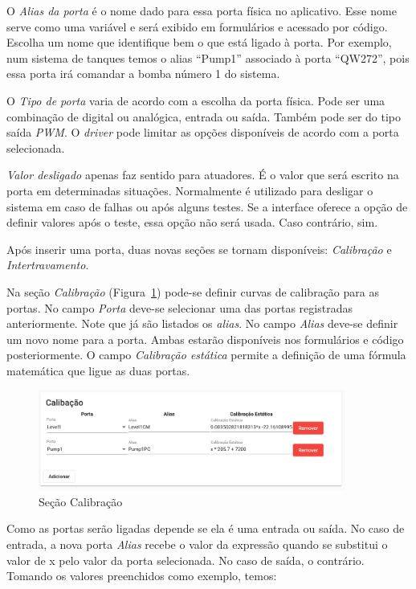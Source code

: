 O \textit{Alias da porta} é o nome dado para essa porta física no aplicativo.
Esse nome serve como uma variável e será exibido em formulários e acessado por
código. Escolha um nome que identifique bem o que está ligado à porta. Por
exemplo, num sistema de tanques temos o alias \enquote{Pump1} associado à porta
\enquote{QW272}, pois essa porta irá comandar a bomba número 1 do sistema.

O \textit{Tipo de porta} varia de acordo com a escolha da porta física. Pode ser
uma combinação de digital ou analógica, entrada ou saída. Também pode ser do
tipo saída \textit{PWM}. O \textit{driver} pode limitar as opções disponíveis de
acordo com a porta selecionada.

\textit{Valor desligado} apenas faz sentido para atuadores. É o valor que será
escrito na porta em determinadas situações. Normalmente é utilizado para
desligar o sistema em caso de falhas ou após alguns testes. Se a interface
oferece a opção de definir valores após o teste, essa opção não será usada. Caso
contrário, sim.

Após inserir uma porta, duas novas seções se tornam disponíveis:
\textit{Calibração} e \textit{Intertravamento}.

Na seção \textit{Calibração} (Figura~\ref{fig:hardware4}) pode-se definir curvas
de calibração para as portas. No campo \textit{Porta} deve-se selecionar uma das
portas registradas anteriormente. Note que já são listados os \textit{alias}. No
campo \textit{Alias} deve-se definir um novo nome para a porta. Ambas estarão
disponíveis nos formulários e código posteriormente. O campo \textit{Calibração
estática} permite a definição de uma fórmula matemática que ligue as duas
portas.

\begin{figure}[ht!]
    \centering
    \includegraphics[width=0.9\textwidth]{imgs/hardware4}
    \caption[Seção Calibração]{Seção Calibração}%
    \label{fig:hardware4}
\end{figure}

Como as portas serão ligadas depende se ela é uma entrada ou saída. No caso de
entrada, a nova porta \textit{Alias} recebe o valor da expressão quando se
substitui o valor de x pelo valor da porta selecionada. No caso de saída, o
contrário. Tomando os valores preenchidos como exemplo, temos:

